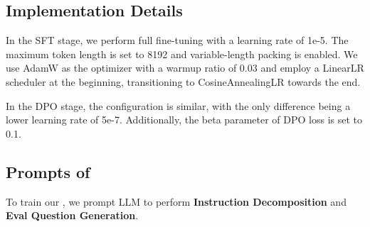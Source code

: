 \subsection{Implementation Details}
\label{sec:experiment}

In the SFT stage, we perform full fine-tuning with a learning rate of 1e-5. The maximum token length is set to 8192 and variable-length packing is enabled. We use AdamW \citep{loshchilov2017decoupled} as the optimizer with a warmup ratio of 0.03 and employ a LinearLR scheduler at the beginning, transitioning to CosineAnnealingLR towards the end.

In the DPO stage, the configuration is similar, with the only difference being a lower learning rate of 5e-7. Additionally, the beta parameter of DPO loss is set to 0.1.

\subsection{Prompts of \method}
\label{sec:prompt}
To train our \textbf{\composer}, we prompt LLM to perform \textbf{Instruction Decomposition} and \textbf{Eval Question Generation}.

